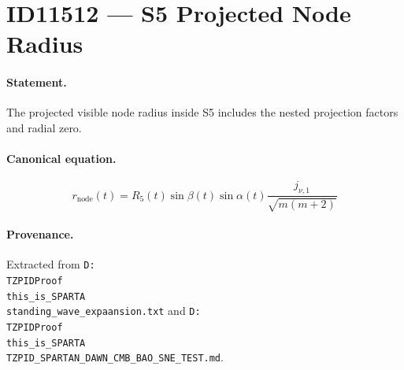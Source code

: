 \section*{ID11512 --- S5 Projected Node Radius}

\paragraph{Statement.}
The projected visible node radius inside S5 includes the nested projection factors and radial zero.

\paragraph{Canonical equation.}
\[
r_{\mathrm{node}}(t)=R_5(t)\sin\beta(t)\sin\alpha(t)\frac{j_{\nu,1}}{\sqrt{m(m+2)}}
\]

\paragraph{Provenance.}
Extracted from \texttt{D:\\TZPIDProof\\this\_is\_SPARTA\\standing\_wave\_expaansion.txt} and \texttt{D:\\TZPIDProof\\this\_is\_SPARTA\\TZPID\_SPARTAN\_DAWN\_CMB\_BAO\_SNE\_TEST.md}.
